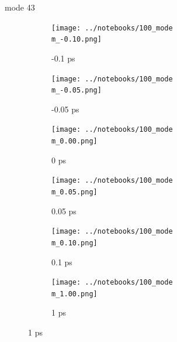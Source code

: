 \documentclass{beamer}
\begin{document}
\renewcommand\m{43}
\begin{frame}{mode \m}
	\begin{figure}
		\centering
		\begin{subfigure}[b]{\w\textwidth}
			\centering
			\texttt{[image: ../notebooks/100\_mode\\m\_-0.10.png]}
			\caption{-0.1 ps}
		\end{subfigure}
		\begin{subfigure}[b]{\w\textwidth}
			\centering
			\texttt{[image: ../notebooks/100\_mode\\m\_-0.05.png]}
			\caption{-0.05 ps}
		\end{subfigure}
		\begin{subfigure}[b]{\w\textwidth}
			\centering
			\texttt{[image: ../notebooks/100\_mode\\m\_0.00.png]}
			\caption{0 ps}
		\end{subfigure}
		\begin{subfigure}[b]{\w\textwidth}
			\centering
			\texttt{[image: ../notebooks/100\_mode\\m\_0.05.png]}
			\caption{0.05 ps}
		\end{subfigure}
		\begin{subfigure}[b]{\w\textwidth}
			\centering
			\texttt{[image: ../notebooks/100\_mode\\m\_0.10.png]}
			\caption{0.1 ps}
		\end{subfigure}
		\begin{subfigure}[b]{\w\textwidth}
			\centering
			\texttt{[image: ../notebooks/100\_mode\\m\_1.00.png]}
			\caption{1 ps}
		\end{subfigure}
	\end{figure}
\end{frame}
\end{document}
